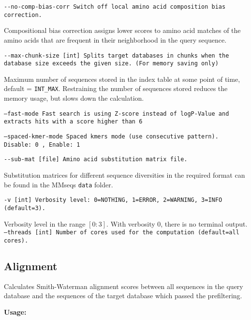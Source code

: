 \documentclass[11pt,a4paper]{report}
\begin{document}
\texttt{\small -{}-no-comp-bias-corr Switch off local amino acid composition
bias correction.}{\small \par}

Compositional bias correction assigns lower scores to amino acid matches
of the amino acids that are frequent in their neighborhood in the
query sequence.

\texttt{\small -{}-max-chunk-size {[}int{]} Splits target databases
in chunks when the database size exceeds the given size. (For memory
saving only)}{\small \par}

Maximum number of sequences stored in the index table at some point
of time, default = \texttt{INT\_MAX}. Restraining the number of sequences
stored reduces the memory usage, but slows down the calculation.

\texttt{\small --fast-mode Fast search is using Z-score instead of logP-Value and extracts hits with a score higher than 6}{\small \par}
 


\texttt{\small --spaced-kmer-mode       Spaced kmers mode (use consecutive pattern). Disable: 0             , Enable: 1}{\small \par}


\texttt{\small -{}-sub-mat {[}file{]} Amino acid substitution matrix
file.}{\small \par}

Substitution matrices for different sequence diversities in the required
format can be found in the MMseqs \texttt{data} folder.

\texttt{\small -v {[}int{]} Verbosity level: 0=NOTHING, 1=ERROR, 2=WARNING,
3=INFO (default=3).}{\small \par}

Verbosity level in the range $[0:3]$. With verbosity $0$, there
is no terminal output.
\texttt{\small --threads {[}int{]} Number of cores used for the computation
(default=all cores).}{\small \par}


\subsection{Alignment}

Calculates Smith-Waterman alignment scores between all sequences in
the query database and the sequences of the target database which
passed the prefiltering.

\textbf{Usage:}
\end{document}
